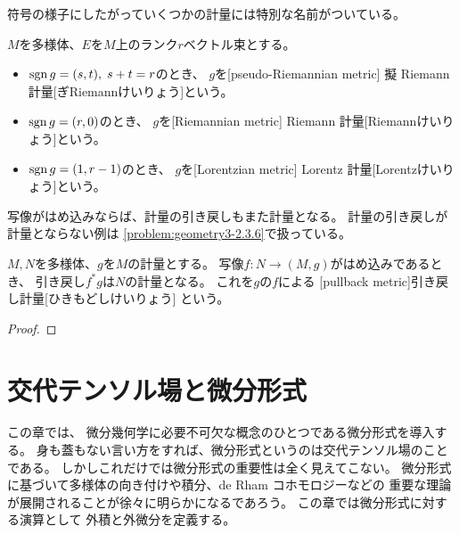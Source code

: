 \documentclass[report]{jlreq}
\begin{document}
符号の様子にしたがっていくつかの計量には特別な名前がついている。

\begin{definition}[計量の例]
    $M$を多様体、$E$を$M$上のランク$r$ベクトル束とする。
    \begin{itemize}
        \item $\operatorname{sgn} g = (s, t), \; s + t = r$のとき、
            $g$を[pseudo-Riemannian metric]
            {擬 Riemann 計量}[ぎRiemannけいりょう]という。
        \item $\operatorname{sgn} g = (r, 0)$のとき、
            $g$を[Riemannian metric]
            {Riemann 計量}[Riemannけいりょう]という。
        \item $\operatorname{sgn} g = (1, r - 1)$のとき、
            $g$を[Lorentzian metric]
            {Lorentz 計量}[Lorentzけいりょう]という。
    \end{itemize}
\end{definition}

{\smooth}写像がはめ込みならば、計量の引き戻しもまた計量となる。
計量の引き戻しが計量とならない例は
\cref{problem:geometry3-2.3.6}で扱っている。

\begin{proposition}[引き戻し計量]
    $M, N$を多様体、$g$を$M$の計量とする。
    {\smooth}写像$f \colon N \to (M, g)$がはめ込みであるとき、
    引き戻し$f^* g$は$N$の計量となる。
    これを$g$の$f$による
    [pullback metric]{引き戻し計量}[ひきもどしけいりょう]
    という。
\end{proposition}

\begin{proof}
    \TODO{}
\end{proof}




%
\newpage
\chapter{交代テンソル場と微分形式}


この章では、
微分幾何学に必要不可欠な概念のひとつである微分形式を導入する。
身も蓋もない言い方をすれば、微分形式というのは交代テンソル場のことである。
しかしこれだけでは微分形式の重要性は全く見えてこない。
微分形式に基づいて多様体の向き付けや積分、de Rham コホモロジーなどの
重要な理論が展開されることが徐々に明らかになるであろう。
この章では微分形式に対する演算として
外積と外微分を定義する。
\end{document}

